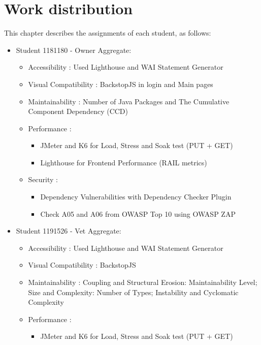\documentclass[a4paper,11pt,openright,BCOR=15mm]{scrbook}
\begin{document}
	
	\chapter{Work distribution}
	This chapter describes the assignments of each student, as follows:\newline
		
		\begin{itemize}
			\item Student 1181180 - Owner Aggregate: 
			\begin{itemize}
				\item Accessibility : Used Lighthouse and WAI Statement Generator
				\item Visual Compatibility : BackstopJS in login and Main pages
				\item Maintainability : Number of Java Packages and The Cumulative Component Dependency (CCD)
				\item Performance : 
				\begin{itemize}
					\item JMeter and K6 for Load, Stress and Soak test (PUT + GET)
					\item Lighthouse for Frontend Performance (RAIL metrics)
				\end{itemize}	
				\item Security : 
				\begin{itemize}
					\item Dependency Vulnerabilities with Dependency Checker Plugin
					\item Check A05 and A06 from OWASP Top 10 using OWASP ZAP
				\end{itemize}	
			\end{itemize}
			\item Student 1191526 - Vet Aggregate: 
			\begin{itemize}
				\item Accessibility : Used Lighthouse and WAI Statement Generator
				\item Visual Compatibility : BackstopJS
				\item Maintainability :  Coupling and Structural Erosion: Maintainability Level;
				Size and Complexity: Number of Types; Instability and Cyclomatic Complexity
				\item Performance : 
				\begin{itemize}
					\item JMeter and K6 for Load, Stress and Soak test (PUT + GET)

\end{itemize}
\end{itemize}
\end{itemize}
\end{document}

